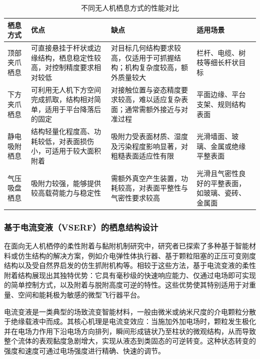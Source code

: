 \begin{table}[htbp]
\centering
\caption{不同无人机栖息方式的性能对比}
\label{tab:perching_comparison}
\renewcommand{\arraystretch}{1.3}
\begin{tabular}{p{2.5cm} p{3.5cm} p{3.8cm} p{4.0cm}}
\toprule
\textbf{栖息方式} & \textbf{优点} & \textbf{缺点} & \textbf{适用场景} \\
\midrule

顶部夹爪栖息
& 可直接悬挂于杆状或边缘结构，栖息稳定性较高，对控制精度要求相对较低
& 对目标几何结构要求较高，仅适用于可抓握结构；机构复杂度较高，额外质量较大
& 栏杆、电缆、树枝等细长杆状目标 \\

下方夹爪栖息
& 可利用无人机下方空间完成抓取，结构相对简单，适用于平台降落后的固定
& 对接触位置与姿态精度要求较高，难以适应复杂表面；通常需额外接近与对准过程
& 平面边缘、平台支架、规则结构表面 \\

静电吸附栖息
& 结构轻量化程度高、功耗较低，对表面损伤小，可适用于较大面积附着
& 吸附力受表面材质、湿度及污染程度影响显著，对粗糙表面适应性有限
& 光滑墙面、玻璃、金属或绝缘平整表面 \\

气压吸盘栖息
& 吸附力较强，能够提供较高载荷能力与稳定性
& 需额外真空产生装置，功耗较高，对表面平整性与气密性要求较高
& 光滑且气密性良好的平整表面，如玻璃、瓷砖、金属面 \\

\bottomrule
\end{tabular}
\end{table}

\subsubsection{基于电流变液（VSERF）的栖息结构设计}

在面向无人机栖停的柔性附着与黏附机制研究中，研究者已探索了多种基于智能材料或仿生结构的解决方案，例如介电弹性体执行器、基于颗粒阻塞的正压可变刚度结构以及受自然界启发的仿生抓附机构等\cite{o2008review, crowley20223d}。相较于这些方法，基于电流变液的柔性附着结构展现出其独特优势：它具有毫秒级的快速响应能力、仅通过电场即可实现的简单控制方式，以及附着与脱附高度可逆的特性。这些优势使其特别适用于对重量、空间和能耗极为敏感的微型飞行器平台\cite{liu2012electrorheological}。

电流变液是一类典型的场致流变智能材料，一般由微米或纳米尺度的介电颗粒分散于绝缘载液中而成。其核心机理是电流变效应：当施加外加电场时，颗粒发生极化并在电场力作用下沿电场方向排列，瞬间形成链状乃至柱状的微观结构，从而导致整个流体的表观黏度急剧增大，实现从液态到类固态的可逆转变\cite{hao2001electrorheological}。这种状态转变的强度和速度可通过电场强度进行精确、快速的调节。

